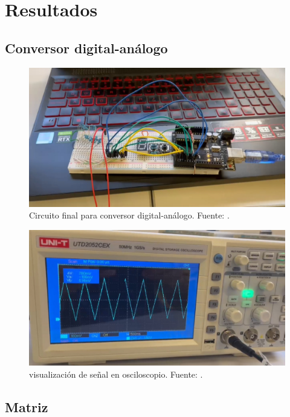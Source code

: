\section{Resultados}
\subsection{Conversor digital-análogo}

\begin{figure}[H]
  \centering
  \includegraphics[width=\linewidth]{./Anexos/Resultados/DAC/Circuito.jpg}
  \caption{Circuito final para conversor digital-análogo. Fuente: \cite{LabDrive}.}
  \label{fig:conversor_circuito}
\end{figure}

\begin{figure}[H]
  \centering
  \includegraphics[width=\linewidth]{./Anexos/Resultados/DAC/Ocsiloscopio.jpg}
  \caption{visualización de señal en osciloscopio. Fuente: \cite{LabDrive}.}
  \label{fig:conversor_osciloscopio}
\end{figure}


\subsection{Matriz}

